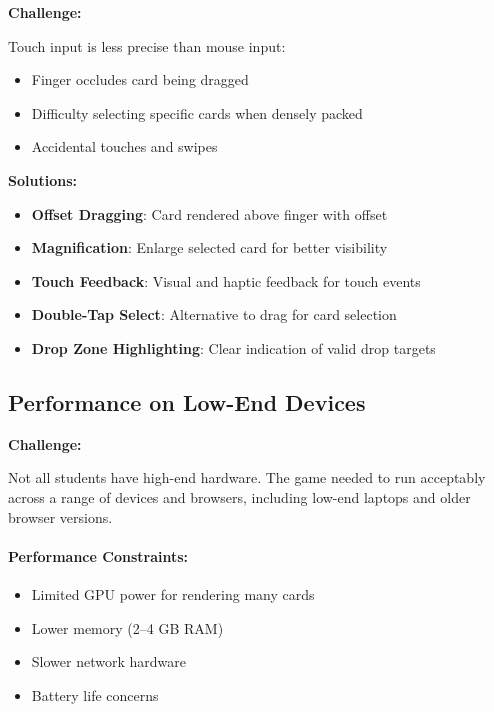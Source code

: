 \textbf{Challenge:}

Touch input is less precise than mouse input:
\begin{itemize}
    \item Finger occludes card being dragged
    \item Difficulty selecting specific cards when densely packed
    \item Accidental touches and swipes
\end{itemize}

\textbf{Solutions:}

\begin{itemize}
    \item \textbf{Offset Dragging}: Card rendered above finger with offset
    \item \textbf{Magnification}: Enlarge selected card for better visibility
    \item \textbf{Touch Feedback}: Visual and haptic feedback for touch events
    \item \textbf{Double-Tap Select}: Alternative to drag for card selection
    \item \textbf{Drop Zone Highlighting}: Clear indication of valid drop targets
\end{itemize}

\subsection{Performance on Low-End Devices}
\label{subsec:lowend-performance}

\textbf{Challenge:}

Not all students have high-end hardware. The game needed to run acceptably across a range of devices and browsers, including low-end laptops and older browser versions.

\paragraph*{Performance Constraints:}

\begin{itemize}
    \item Limited GPU power for rendering many cards
    \item Lower memory (2--4 GB RAM)
    \item Slower network hardware
    \item Battery life concerns
\end{itemize}

